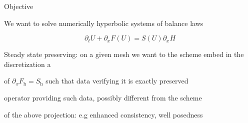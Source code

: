 \begin{frame}[t]{Objective}
\MyLogoa

\vspace{0.5cm}

We want to solve numerically  hyperbolic systems of balance laws

\begin{equation}
	\partial_tU+ \partial_x F(U)=  S(U)\partial_xH \nonumber
\end{equation}
 
 
 \vspace{0.5cm}

Steady state preserving: on a given mesh we want to the scheme embed in the discretization a

\begin{description} 

\vspace{0.2cm}

\item[{\it Definition}] of    $\partial_x F_{\textrm{h}} = S_{\textrm{h}}$ such that data  verifying it is exactly preserved

\vspace{0.2cm}

\item[{\it Projection}]    operator 
providing such data, possibly different from the scheme

\vspace{0.2cm}

\item [{\it Characterization}]  of the above projection: e.g  enhanced consistency, well posedness 
\end{description}
 

  
 
\end{frame}








